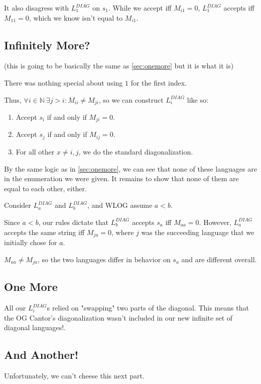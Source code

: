 \documentclass[12pt]{article}
\newcommand{\N}{\mathbb{N}}
\begin{document}
It also disagress with $L_1^{DIAG}$ on $s_1$.
While we accept iff $M_{i1}=0$, $L_1^{DIAG}$ accepts iff $M_{11}=0$,
which we know isn't equal to $M_{i1}$.
\subsection{Infinitely More?}\label{sec:infmore}

(this is going to be basically the same as \ref{sec:onemore} but it is what it is)

There was nothing special about using $1$ for the first index.

Thus, $\forall i \in \N\ \exists j > i: M_{ii} \ne M_{ji}$, so we can construct $L_i^{DIAG}$ like so:
\begin{enumerate}[nolistsep]
    \item Accept $s_i$ if and only if $M_{ji}=0$.
    \item Accept $s_j$ if and only if $M_{ij}=0$.
    \item For all other $x \ne i, j$, we do the standard diagonalization.
\end{enumerate}

By the same logic as in \ref{sec:onemore}, we can see that none
of these languages are in the enumeration we were given.
It remains to show that none of them are equal to each other, either.

Consider $L_a^{DIAG}$ and $L_b^{DIAG}$, and WLOG assume $a < b$.

Since $a < b$, our rules dictate that $L_b^{DIAG}$ accepts $s_a$ iff $M_{aa}=0$.
However, $L_a^{DIAG}$ accepts the same string iff $M_{ja}=0$,
where $j$ was the succeeding language that we initially chose for $a$.

$M_{aa} \ne M_{ja}$, so the two languages differ in behavior on $s_a$ and are different overall.

\subsection{One More}

All our $L_i^{DIAG}$s relied on "swapping" two parts of the diagonal.
This means that the OG Cantor's diagonalization wasn't included in our
new infinite set of diagonal languages!.

\subsection{And Another!}

Unfortunately, we can't cheese this next part.
\end{document}
